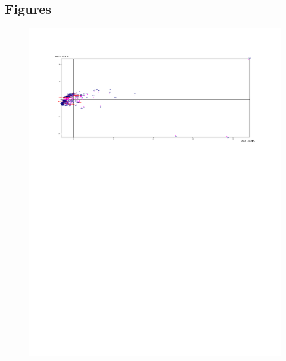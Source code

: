 \documentclass[a4paper,10pt,twocolumn]{article}
\begin{document}
\subsection{Figures}
\begin{figure}[!ht]
\begin{center}
\includegraphics[width=17cm]{f2a.pdf}

\end{center}
\end{figure}
\end{document}
